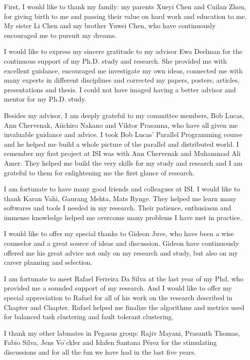 
First, I would like to thank my family: my parents Xueyi Chen and Cuilan Zhou, for giving birth to me and passing their value on hard work and education to me. My sister Li Chen and my brother Yuwei Chen, who have continuously encouraged me to pursuit my dreams. 

I would like to express my sincere gratitude to my advisor Ewa Deelman for the continuous support of my Ph.D. study and research. She provided me with excellent guidance, encouraged me investigate my own ideas, connected me with many experts in different disciplines and corrected my papers, posters, articles, presentations and thesis. I could not have imaged having a better advisor and mentor for my Ph.D. study. 

Besides my advisor, I am deeply grateful to my committee members, Bob Lucas, Ann Chervenak, Aiichiro Nakano and Viktor Prasanna, who have all given me invaluable guidance and advice. I took Bob Lucas' Parallel Programming course and he helped me build a whole picture of the parallel and distributed world. I remember my first project at ISI was with Ann Chervenak and Muhammad Ali Amer. They helped me build the very skills for my study and research and I am grateful to them for enlightening me the first glance of research.

I am fortunate to have many good friends and colleagues at ISI. I would like to thank Karan Vahi, Gaurang Mehta, Mats Rynge. They helped me learn many softwares and tools I needed in my research. Their patience, enthusiasm and immense knowledge helped me overcome many problems I have met in practice. 

I would like to offer my special thanks to Gideon Juve, who have been a wise counselor and a great source of ideas and discussion.  Gideon have continuously offered me his great advice not only on my research and study, but also on my career planning and selection. 

I am fortunate to meet Rafael Ferreira Da Silva at the last year of my Phd, who provided me a sounded support of my research. 
And I would like to offer my special appreciation to Rafael for all of his work on the research described in Chapter and Chapter. Rafael helped me finalize the algorithms and metrics used for balanced task clustering and fault tolerant clustering. 

I thank my other labmates in Pegasus group: Rajiv Mayani, Prasanth Thomas, Fabio Silva, Jens Vo ̈ckler and Idafen Santana Pérez for the stimulating discussions and for all the fun we have had in the last five years. 

